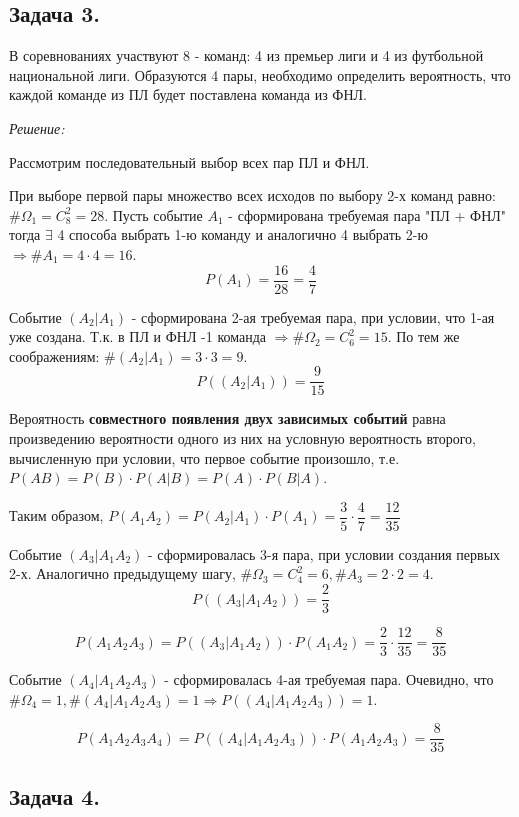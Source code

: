 \subsection*{Задача 3.} 

В соревнованиях участвуют 8 - команд: 4 из премьер лиги и 4 из футбольной национальной лиги. Образуются 4 пары, необходимо определить вероятность, что каждой команде из ПЛ будет поставлена команда из ФНЛ.

\textit{Решение:}

Рассмотрим последовательный выбор всех пар ПЛ и ФНЛ.

При выборе первой пары множество всех исходов по выбору 2-х команд равно: $\# \Omega_1 = C_8^2 = 28$. Пусть событие $A_1$ - сформирована требуемая пара "ПЛ + ФНЛ"\, тогда $\exists$ 4 способа выбрать 1-ю команду и аналогично 4 выбрать 2-ю $\Rightarrow \# A_1 = 4 \cdot 4 = 16$.
\[ P(A_1) = \dfrac{16}{28} = \dfrac{4}{7} \]

Событие $(A_2|A_1)$ - сформирована 2-ая требуемая пара, при условии, что 1-ая уже создана. Т.к. в ПЛ и ФНЛ -1 команда $\Rightarrow \# \Omega_2 = C_6^2 = 15$. По тем же соображениям: $\# (A_2|A_1) = 3 \cdot 3 = 9$. 
\[ P((A_2|A_1)) = \dfrac{9}{15} \]

Вероятность \textbf{совместного появления двух зависимых событий} равна произведению вероятности одного из них на условную вероятность второго, вычисленную при условии, что первое событие произошло, т.е. $P(AB) = P(B) \cdot P(A|B) = P(A) \cdot P(B|A)$.

Таким образом, $P(A_1A_2) = P(A_2|A_1) \cdot P(A_1) = \dfrac{3}{5} \cdot \dfrac{4}{7} = \dfrac{12}{35}$

Событие $(A_3|A_1A_2)$ - сформировалась 3-я пара, при условии создания первых 2-х. Аналогично предыдущему шагу, $\# \Omega_3 = C_4^2 = 6, \# A_3 = 2 \cdot 2 = 4$.
\[ P((A_3|A_1A_2)) = \dfrac{2}{3} \]

\[ P(A_1A_2A_3) = P((A_3|A_1A_2)) \cdot P(A_1A_2) = \dfrac{2}{3} \cdot \dfrac{12}{35} = \dfrac{8}{35} \]

Событие $(A_4|A_1A_2A_3)$ - сформировалась 4-ая требуемая пара. Очевидно, что $\# \Omega_4 = 1, \# (A_4|A_1A_2A_3) = 1 \Rightarrow P((A_4|A_1A_2A_3)) = 1$.

\[ P(A_1A_2A_3A_4) = P((A_4|A_1A_2A_3)) \cdot P(A_1A_2A_3) = \dfrac{8}{35} \]

\subsection*{Задача 4.}

